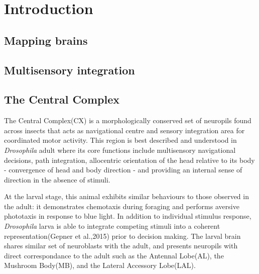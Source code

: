 
\chapter{Introduction}  

\section{Mapping brains} 
\label{section1.1}


\section{}
\label{section1.2}



\section{Multisensory integration} 
\label{section1.3}

\section{The Central Complex}
The Central Complex(CX) is a morphologically conserved set of neuropils found across insects
that acts as navigational centre and sensory integration area for coordinated motor activity.
This region is best described %
and understood %
in \textit{Drosophila} adult where its core functions include multisensory navigational decisions, path integration, allocentric orientation of the head relative to its body - convergence of head and body direction - and providing an internal sense of direction in the absence of stimuli. %

At the larval stage, this animal exhibits  similar behaviours to those observed in the adult: it demonstrates chemotaxis during foraging and performs aversive phototaxis in response to blue light. In addition to individual stimulus response, \textit{Drosophila} larva is able to integrate competing stimuli into a coherent representation(Gepner et al.,2015) prior to decision making. The larval brain shares similar set of neuroblasts with the adult, and presents neuropils with direct correspondance to the adult such as the Antennal Lobe(AL), the Mushroom Body(MB), and the Lateral Accessory Lobe(LAL). 

